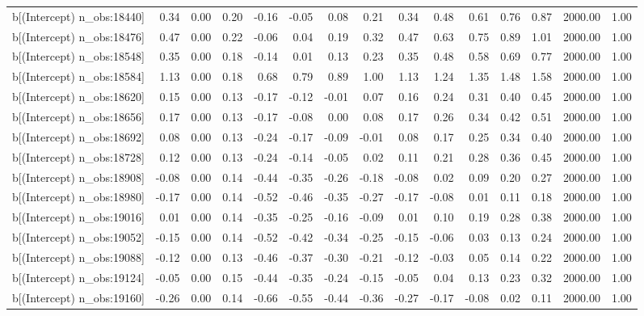 \begin{table}[ht]
\begin{tabular}{rrrrrrrrrrrrrrr}
  b[(Intercept) n\_obs:18440] & 0.34 & 0.00 & 0.20 & -0.16 & -0.05 & 0.08 & 0.21 & 0.34 & 0.48 & 0.61 & 0.76 & 0.87 & 2000.00 & 1.00 \\ 
  b[(Intercept) n\_obs:18476] & 0.47 & 0.00 & 0.22 & -0.06 & 0.04 & 0.19 & 0.32 & 0.47 & 0.63 & 0.75 & 0.89 & 1.01 & 2000.00 & 1.00 \\ 
  b[(Intercept) n\_obs:18548] & 0.35 & 0.00 & 0.18 & -0.14 & 0.01 & 0.13 & 0.23 & 0.35 & 0.48 & 0.58 & 0.69 & 0.77 & 2000.00 & 1.00 \\ 
  b[(Intercept) n\_obs:18584] & 1.13 & 0.00 & 0.18 & 0.68 & 0.79 & 0.89 & 1.00 & 1.13 & 1.24 & 1.35 & 1.48 & 1.58 & 2000.00 & 1.00 \\ 
  b[(Intercept) n\_obs:18620] & 0.15 & 0.00 & 0.13 & -0.17 & -0.12 & -0.01 & 0.07 & 0.16 & 0.24 & 0.31 & 0.40 & 0.45 & 2000.00 & 1.00 \\ 
  b[(Intercept) n\_obs:18656] & 0.17 & 0.00 & 0.13 & -0.17 & -0.08 & 0.00 & 0.08 & 0.17 & 0.26 & 0.34 & 0.42 & 0.51 & 2000.00 & 1.00 \\ 
  b[(Intercept) n\_obs:18692] & 0.08 & 0.00 & 0.13 & -0.24 & -0.17 & -0.09 & -0.01 & 0.08 & 0.17 & 0.25 & 0.34 & 0.40 & 2000.00 & 1.00 \\ 
  b[(Intercept) n\_obs:18728] & 0.12 & 0.00 & 0.13 & -0.24 & -0.14 & -0.05 & 0.02 & 0.11 & 0.21 & 0.28 & 0.36 & 0.45 & 2000.00 & 1.00 \\ 
  b[(Intercept) n\_obs:18908] & -0.08 & 0.00 & 0.14 & -0.44 & -0.35 & -0.26 & -0.18 & -0.08 & 0.02 & 0.09 & 0.20 & 0.27 & 2000.00 & 1.00 \\ 
  b[(Intercept) n\_obs:18980] & -0.17 & 0.00 & 0.14 & -0.52 & -0.46 & -0.35 & -0.27 & -0.17 & -0.08 & 0.01 & 0.11 & 0.18 & 2000.00 & 1.00 \\ 
  b[(Intercept) n\_obs:19016] & 0.01 & 0.00 & 0.14 & -0.35 & -0.25 & -0.16 & -0.09 & 0.01 & 0.10 & 0.19 & 0.28 & 0.38 & 2000.00 & 1.00 \\ 
  b[(Intercept) n\_obs:19052] & -0.15 & 0.00 & 0.14 & -0.52 & -0.42 & -0.34 & -0.25 & -0.15 & -0.06 & 0.03 & 0.13 & 0.24 & 2000.00 & 1.00 \\ 
  b[(Intercept) n\_obs:19088] & -0.12 & 0.00 & 0.13 & -0.46 & -0.37 & -0.30 & -0.21 & -0.12 & -0.03 & 0.05 & 0.14 & 0.22 & 2000.00 & 1.00 \\ 
  b[(Intercept) n\_obs:19124] & -0.05 & 0.00 & 0.15 & -0.44 & -0.35 & -0.24 & -0.15 & -0.05 & 0.04 & 0.13 & 0.23 & 0.32 & 2000.00 & 1.00 \\ 
  b[(Intercept) n\_obs:19160] & -0.26 & 0.00 & 0.14 & -0.66 & -0.55 & -0.44 & -0.36 & -0.27 & -0.17 & -0.08 & 0.02 & 0.11 & 2000.00 & 1.00 \\ 

\end{tabular}
\end{table}
